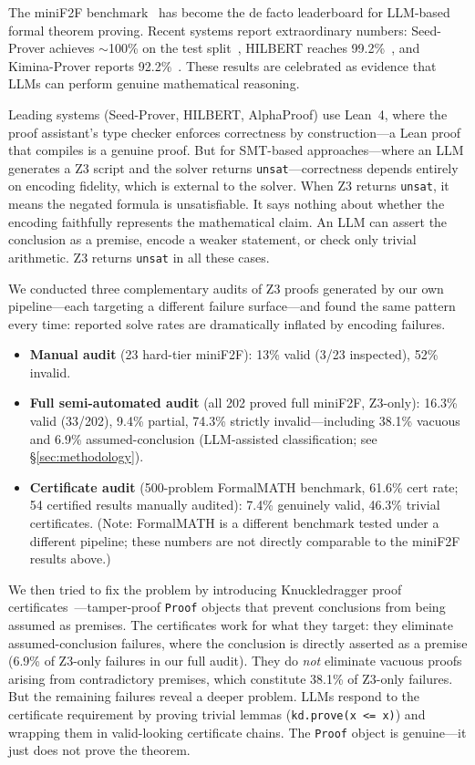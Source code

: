 \documentclass[11pt]{article}
\begin{document}
The miniF2F benchmark~\cite{zheng2022minif2f} has become the de facto leaderboard for LLM-based formal theorem proving. Recent systems report extraordinary numbers: Seed-Prover achieves $\sim$100\% on the test split~\cite{seedprover2025}, HILBERT reaches 99.2\%~\cite{hilbert2025}, and Kimina-Prover reports 92.2\%~\cite{kimina2025}. These results are celebrated as evidence that LLMs can perform genuine mathematical reasoning.

Leading systems (Seed-Prover, HILBERT, AlphaProof) use Lean~4, where the proof assistant's type checker enforces correctness by construction---a Lean proof that compiles is a genuine proof. But for SMT-based approaches---where an LLM generates a Z3 script and the solver returns \texttt{unsat}---correctness depends entirely on encoding fidelity, which is external to the solver. When Z3 returns \texttt{unsat}, it means the negated formula is unsatisfiable. It says nothing about whether the encoding faithfully represents the mathematical claim. An LLM can assert the conclusion as a premise, encode a weaker statement, or check only trivial arithmetic. Z3 returns \texttt{unsat} in all these cases.

We conducted three complementary audits of Z3 proofs generated by our own pipeline---each targeting a different failure surface---and found the same pattern every time: reported solve rates are dramatically inflated by encoding failures.

\begin{itemize}[leftmargin=*,itemsep=2pt]
    \item \textbf{Manual audit} (23 hard-tier miniF2F): 13\% valid (3/23 inspected), 52\% invalid.
    \item \textbf{Full semi-automated audit} (all 202 proved full miniF2F, Z3-only): 16.3\% valid (33/202), 9.4\% partial, 74.3\% strictly invalid---including 38.1\% vacuous and 6.9\% assumed-conclusion (LLM-assisted classification; see \S\ref{sec:methodology}).
    \item \textbf{Certificate audit} (500-problem FormalMATH benchmark, 61.6\% cert rate; 54 certified results manually audited): 7.4\% genuinely valid, 46.3\% trivial certificates. (Note: FormalMATH is a different benchmark tested under a different pipeline; these numbers are not directly comparable to the miniF2F results above.)
\end{itemize}

We then tried to fix the problem by introducing Knuckledragger proof certificates~\cite{knuckledragger2026}---tamper-proof \texttt{Proof} objects that prevent conclusions from being assumed as premises. The certificates work for what they target: they eliminate assumed-conclusion failures, where the conclusion is directly asserted as a premise (6.9\% of Z3-only failures in our full audit). They do \emph{not} eliminate vacuous proofs arising from contradictory premises, which constitute 38.1\% of Z3-only failures. But the remaining failures reveal a deeper problem. LLMs respond to the certificate requirement by proving trivial lemmas (\texttt{kd.prove(x <= x)}) and wrapping them in valid-looking certificate chains. The \texttt{Proof} object is genuine---it just does not prove the theorem.
\end{document}
